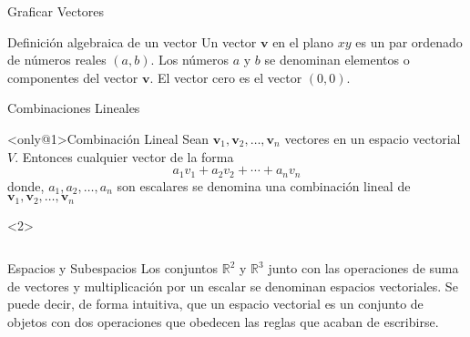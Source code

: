 \begin{frame}{Graficar Vectores}
  \begin{block}{Definición algebraica de un vector} \justifying
     Un \alert{vector $\bm{v}$} en el plano $xy$ es un par ordenado de números reales $(a, b)$. Los
números $a$ y $b$ se denominan \alert{elementos} o \alert{componentes} del vector $\bm{v}$. El \alert{vector cero} es el vector $(0, 0)$.
\end{block}


\end{frame}

\begin{frame}{Combinaciones Lineales}
  \begin{block}<only@1>{Combinación Lineal} \justifying
    Sean $\bm{v}_1, \bm{v}_2, \ldots, \bm{v}_n$ vectores en un espacio vectorial $V$. Entonces cualquier vector de la forma \[a_1v_1+ a_2v_2+ \cdots+ a_nv_n \] donde, $a_1, a_2, \ldots, a_n$ son escalares se denomina una \alert{combinación lineal} de $\bm{v}_1, \bm{v}_2, \ldots, \bm{v}_n$
  \end{block}

  \begin{onlyenv}<2>
      \begin{columns}[t]
    
    
  \end{columns}
  \end{onlyenv}
\end{frame}


\begin{frame}{Espacios y Subespacios}
  Los conjuntos $\mathbb{R}^2$ y $\mathbb{R}^3$ junto con las operaciones de suma de vectores y multiplicación por un escalar se denominan \alert{espacios vectoriales}. Se puede decir, de forma intuitiva, que un espacio vectorial es un conjunto de objetos con dos operaciones que obedecen las reglas que acaban de escribirse.
\end{frame}


